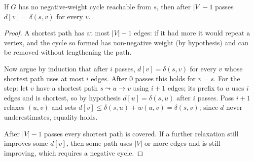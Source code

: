 \begin{theorem}\label{thm:bellman}
If $G$ has no negative-weight cycle reachable from $s$, then after $|V|-1$
passes $d[v] = \delta(s,v)$ for every $v$.
\end{theorem}

\begin{proof}
A shortest path has at most $|V|-1$ edges: if it had more it would repeat a
vertex, and the cycle so formed has non-negative weight (by hypothesis) and can
be removed without lengthening the path.

\smallskip
Now argue by induction that after $i$ passes, $d[v] = \delta(s,v)$ for every
$v$ whose shortest path uses at most $i$ edges. After 0 passes this holds for
$v = s$. For the step: let $v$ have a shortest path $s \leadsto u \to v$ using
$i+1$ edges; its prefix to $u$ uses $i$ edges and is shortest, so by hypothesis
$d[u] = \delta(s,u)$ after $i$ passes. Pass $i+1$ relaxes $(u,v)$ and sets
$d[v] \le \delta(s,u)+w(u,v) = \delta(s,v)$; since $d$ never underestimates,
equality holds.

\smallskip
After $|V|-1$ passes every shortest path is covered. If a further relaxation
still improves some $d[v]$, then some path uses $|V|$ or more edges and is
still improving, which requires a negative cycle.
\end{proof}

